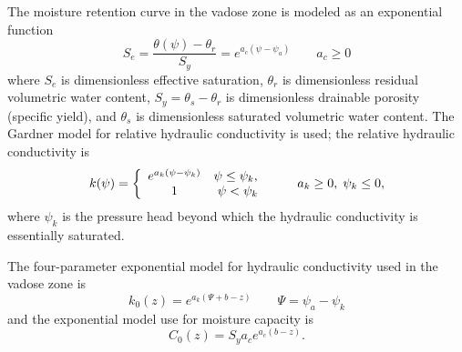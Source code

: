 \documentclass[12pt,letterpaper]{article}
\begin{document}
The moisture retention curve in the vadose zone is modeled as an exponential function
\begin{equation}\nonumber
S_e = \frac{\theta(\psi) - \theta_r}{S_y} = e^{a_c \left( \psi - \psi_a \right)} \qquad a_c \ge 0 
\end{equation}
where $S_e$ is dimensionless effective saturation, $\theta_r$ is dimensionless residual volumetric water content, $S_y=\theta_s - \theta_r$ is dimensionless drainable porosity (specific yield), and $\theta_s$ is dimensionless saturated volumetric water content.  The Gardner model for relative hydraulic conductivity is used; the relative hydraulic conductivity is
\begin{equation}
  \nonumber
  k(\psi) = \left  \{ 
    \begin{array}{c c}
      e^{a_k \left( \psi - \psi_k\right)} & \psi \le \psi_k, \ \\
      1 & \psi < \psi_k\\
    \end{array} 
\right . \qquad a_k \ge 0,\; \psi_k \le 0,
\end{equation}
where $\psi_k$ is the pressure head beyond which the hydraulic conductivity is essentially saturated.  

The four-parameter exponential model for hydraulic conductivity used in the vadose zone is 
\begin{equation}
  \label{eq:Gardner}
 k_0(z)=e^{a_k\left( \Psi + b - z\right)} \qquad \Psi=\psi_a-\psi_k
\end{equation}
and the exponential model use for moisture capacity is
\begin{equation}
  \label{eq:mrc}
C_0(z) = S_y a_c e^{a_c \left( b-z\right)}.
\end{equation}
\end{document}
